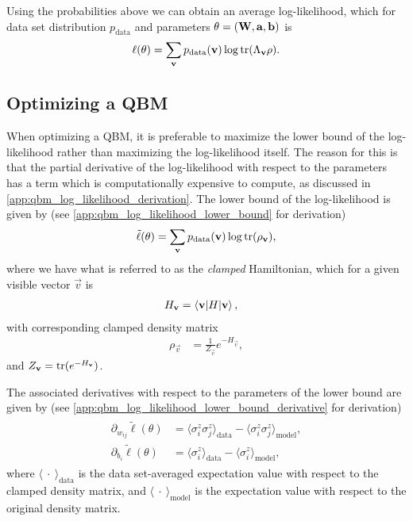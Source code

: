 Using the probabilities above we can obtain an average log-likelihood, which for data set distribution \( p_\text{data} \) and parameters \( \theta = (\mathbf{W}, \mathbf{a}, \mathbf{b}) \) is
\begin{align}
    \ell(\theta) = \sum_{\mathbf{v}} p_{\text{data}}(\mathbf{v}) \log \text{tr}(\Lambda_{\mathbf{v}}\rho).
\end{align}

\subsection{Optimizing a QBM}
When optimizing a QBM, it is preferable to maximize the lower bound of the log-likelihood rather than maximizing the log-likelihood itself.
The reason for this is that the partial derivative of the log-likelihood with respect to the parameters has a term which is computationally expensive to compute, as discussed in \cref{app:qbm_log_likelihood_derivation}.
The lower bound of the log-likelihood is given by (see \cref{app:qbm_log_likelihood_lower_bound} for derivation)
\begin{align}
    \tilde{\ell}(\theta) = \sum_{\mathbf{v}} p_{\text{data}}(\mathbf{v}) \log \text{tr}(\rho_{\mathbf{v}}),
\end{align}
where we have what is referred to as the \textit{clamped} Hamiltonian, which for a given visible vector \( \vec{v} \) is
\begin{align}
    H_{\mathbf{v}}
        &= \braket{\mathbf{v}|H|\mathbf{v}},
\end{align}
with corresponding clamped density matrix
\begin{align}
    \rho_\vec{v}
        &= \frac{1}{Z_\vec{v}} e^{-H_\vec{v}},
\end{align}
and \( Z_{\mathbf{v}} = \text{tr}(e^{-H_{\mathbf{v}}}) \).

The associated derivatives with respect to the parameters of the lower bound are given by (see \cref{app:qbm_log_likelihood_lower_bound_derivative} for derivation)
\begin{align}
\begin{split}
    \partial_{w_{ij}} \tilde{\ell}(\theta)
        &= \langle \sigma_i^z \sigma_j^z \rangle_\text{data} - \langle \sigma_i^z \sigma_j^z \rangle_\text{model}, \\
    \partial_{b_i} \tilde{\ell}(\theta)
        &= \langle \sigma_i^z \rangle_\text{data} - \langle \sigma_i^z \rangle_\text{model},
\end{split}
\end{align}
where \( \langle \ \cdot \ \rangle_\text{data} \) is the data set-averaged expectation value with respect to the clamped density matrix, and \( \langle \ \cdot \ \rangle_\text{model} \) is the expectation value with respect to the original density matrix.

